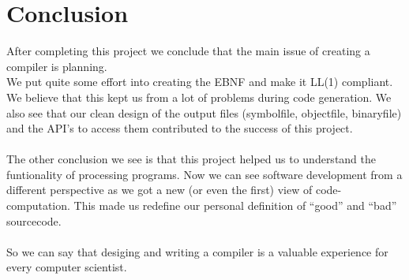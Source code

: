 \part{Conclusion}
\label{conclusion}
After completing this project we conclude that the main issue of creating a
compiler is planning. \\
We put quite some effort into creating the EBNF and make it LL(1) compliant. We
believe that this kept us from a lot of problems during code generation. We
also see that our clean design of the output files (symbolfile, objectfile,
binaryfile) and the API's to access them contributed to the success of this project.
\\ \\
The other conclusion we see is that this project helped us to understand the
funtionality of processing programs. Now we can see software development from a different
perspective as we got a new (or even the first) view of code-computation. This
made us redefine our personal definition of ``good'' and ``bad'' sourcecode. 
\\ \\
So we can say that desiging and writing a compiler is a valuable experience for
every computer scientist.  
